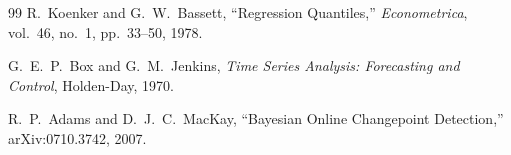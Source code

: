 \documentclass[twocolumn, lastpage]{jarticle}
\begin{document}
\begin{thebibliography}{99}
R.~Koenker and G.~W.~Bassett,
``Regression Quantiles,''
\textit{Econometrica}, vol.~46, no.~1, pp.~33--50, 1978.

G.~E.~P.~Box and G.~M.~Jenkins,
\textit{Time Series Analysis: Forecasting and Control},
Holden-Day, 1970.

R.~P.~Adams and D.~J.~C.~MacKay,
``Bayesian Online Changepoint Detection,''
arXiv:0710.3742, 2007.

\end{thebibliography}
\end{document}
